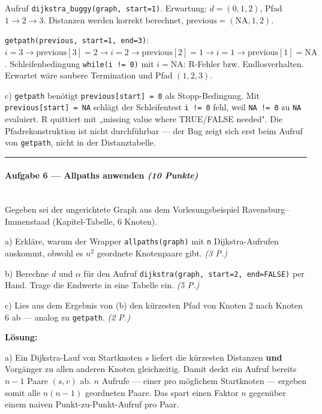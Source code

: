 \documentclass[11pt, a4paper]{article}
\begin{document}
Aufruf \texttt{dijkstra\_buggy(graph, start=1)}. Erwartung: $d=(0,1,2)$, Pfad $1\to 2\to 3$. Distanzen werden korrekt berechnet, $\text{previous}=(\text{NA},1,2)$.


\texttt{getpath(previous, start=1, end=3)}: $i=3 \to \text{previous}[3]=2 \to i=2 \to \text{previous}[2]=1 \to i=1 \to \text{previous}[1]=\text{NA}$. Schleifenbedingung \texttt{while(i != 0)} mit $i=\text{NA}$: R-Fehler bzw. Endlosverhalten. Erwartet wäre saubere Termination und Pfad $(1,2,3)$.


c) \texttt{getpath} benötigt \texttt{previous[start] = 0} als Stopp-Bedingung. Mit \texttt{previous[start] = NA} schlägt der Schleifentest \texttt{i != 0} fehl, weil \texttt{NA != 0} zu \texttt{NA} evaluiert. R quittiert mit „missing value where TRUE/FALSE needed". Die Pfadrekonstruktion ist nicht durchführbar — der Bug zeigt sich erst beim Aufruf von \texttt{getpath}, nicht in der Distanztabelle.



\noindent\textcolor{rulegray}{\rule{\linewidth}{0.4pt}}


\paragraph{Aufgabe 6 — Allpaths anwenden \textit{(10 Punkte)}}\mbox{}\\[2pt]

Gegeben sei der ungerichtete Graph aus dem Vorlesungsbeispiel Ravensburg–Immenstaad (Kapitel-Tabelle, 6 Knoten).


a) Erkläre, warum der Wrapper \texttt{allpaths(graph)} mit \texttt{n} Dijkstra-Aufrufen auskommt, obwohl es $n^2$ geordnete Knotenpaare gibt. \textit{(3 P.)}


b) Berechne $d$ und $\alpha$ für den Aufruf \texttt{dijkstra(graph, start=2, end=FALSE)} per Hand. Trage die Endwerte in eine Tabelle ein. \textit{(5 P.)}


c) Lies aus dem Ergebnis von (b) den kürzesten Pfad von Knoten 2 nach Knoten 6 ab — analog zu \texttt{getpath}. \textit{(2 P.)}


\textbf{Lösung:}


a) Ein Dijkstra-Lauf von Startknoten $s$ liefert die kürzesten Distanzen \textbf{und} Vorgänger zu allen anderen Knoten gleichzeitig. Damit deckt ein Aufruf bereits $n-1$ Paare $(s, v)$ ab. $n$ Aufrufe — einer pro möglichem Startknoten — ergeben somit alle $n(n-1)$ geordneten Paare. Das spart einen Faktor $n$ gegenüber einem naiven Punkt-zu-Punkt-Aufruf pro Paar.
\end{document}
